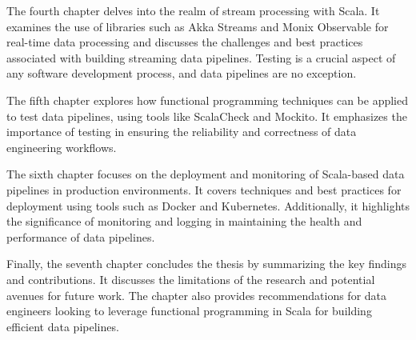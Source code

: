 The fourth chapter delves into the realm of stream processing with Scala. It examines the use of libraries such as Akka Streams and Monix Observable for real-time data processing and discusses the challenges and best practices associated with building streaming data pipelines. Testing is a crucial aspect of any software development process, and data pipelines are no exception.

The fifth chapter explores how functional programming techniques can be applied to test data pipelines, using tools like ScalaCheck and Mockito. It emphasizes the importance of testing in ensuring the reliability and correctness of data engineering workflows.

The sixth chapter focuses on the deployment and monitoring of Scala-based data pipelines in production environments. It covers techniques and best practices for deployment using tools such as Docker and Kubernetes. Additionally, it highlights the significance of monitoring and logging in maintaining the health and performance of data pipelines.

Finally, the seventh chapter concludes the thesis by summarizing the key findings and contributions. It discusses the limitations of the research and potential avenues for future work. The chapter also provides recommendations for data engineers looking to leverage functional programming in Scala for building efficient data pipelines.